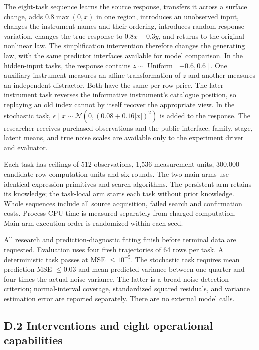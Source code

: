 \documentclass[11pt,a4paper]{article}
\begin{document}
The eight-task sequence learns the source response, transfers it across a
surface change, adds \(0.8\max(0,x)\) in one region, introduces an unobserved input,
changes the instrument names and their ordering, introduces random response
variation, changes the true response to \(0.8x-0.3y\), and returns to the original
nonlinear law. The simplification intervention therefore changes the generating
law, with the same predictor interfaces available for model comparison. In the hidden-input tasks, the response contains
\(z\sim\operatorname{Uniform}[-0.6,0.6]\). One auxiliary instrument measures an
affine transformation of \(z\) and another measures an independent distractor.
Both have the same per-row price. The later instrument task reverses the
informative instrument's catalogue position, so replaying an old index cannot
by itself recover the appropriate view. In the stochastic task,
\(\epsilon\mid x\sim\mathcal N(0,(0.08+0.16|x|)^2)\) is added to the response.
The researcher receives purchased observations and the public interface; family,
stage, latent means, and true noise scales are available only to the experiment
driver and evaluator.


Each task has ceilings of 512 observations, 1,536 measurement units, 300,000
candidate-row computation units and six rounds. The two main arms use identical
expression primitives and search algorithms. The persistent arm retains its
knowledge; the task-local arm starts each task without prior knowledge. Whole
sequences include all source acquisition, failed search and confirmation costs.
Process CPU time is measured separately from charged computation. Main-arm
execution order is randomized within each seed.


All research and prediction-diagnostic fitting finish before terminal data are
requested. Evaluation uses four fresh trajectories of 64 rows per task. A
deterministic task passes at MSE \(\leq10^{-5}\). The stochastic task requires mean
prediction MSE \(\leq0.03\) and mean predicted variance between one quarter and four
times the actual noise variance. The latter is a broad noise-detection criterion;
normal-interval coverage, standardized squared residuals, and variance estimation
error are reported separately. There are no external model calls.


\subsection*{D.2 Interventions and eight operational capabilities}
\end{document}
